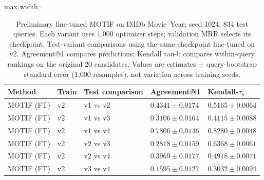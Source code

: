 \begin{table}[htbp]
\centering
\small
\renewcommand{\arraystretch}{1.15}
\setlength{\tabcolsep}{5pt}
\begin{adjustbox}{max width=\linewidth}
\begin{tabular}{|l|l|l|l|l|}
\hline
\textbf{Method} & \textbf{Train} & \textbf{Test comparison} & \textbf{Agreement@1} & \textbf{Kendall-$\tau_b$} \\
\hline
MOTIF (FT) & v2 & v1 vs v2 & $0.4341 \pm 0.0174$ & $0.5165 \pm 0.0064$ \\
\hline
MOTIF (FT) & v2 & v1 vs v3 & $0.3106 \pm 0.0164$ & $0.4115 \pm 0.0088$ \\
\hline
MOTIF (FT) & v2 & v1 vs v4 & $0.7806 \pm 0.0146$ & $0.8280 \pm 0.0048$ \\
\hline
MOTIF (FT) & v2 & v2 vs v3 & $0.2818 \pm 0.0159$ & $0.6368 \pm 0.0061$ \\
\hline
MOTIF (FT) & v2 & v2 vs v4 & $0.3969 \pm 0.0177$ & $0.4918 \pm 0.0071$ \\
\hline
MOTIF (FT) & v2 & v3 vs v4 & $0.1595 \pm 0.0127$ & $0.3032 \pm 0.0094$ \\
\hline
\end{tabular}
\end{adjustbox}
\caption{Preliminary fine-tuned MOTIF on IMDb Movie--Year; seed 1024, 834 test queries. Each variant uses 1,000 optimizer steps; validation MRR selects its checkpoint. Test-variant comparisons using the same checkpoint fine-tuned on v2. Agreement@1 compares predictions; Kendall tau-b compares within-query rankings on the original 20 candidates. Values are estimates $\pm$ query-bootstrap standard error (1,000 resamples), not variation across training seeds.}
\label{tab:motif-imdb-movie-year-matrix-transfer-comparisons-v2}
\end{table}

